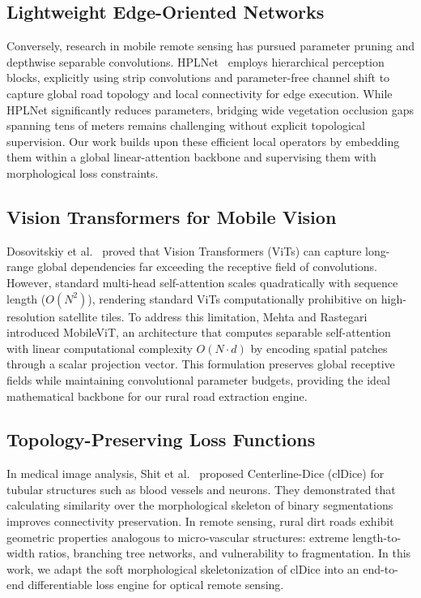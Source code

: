 \documentclass[conference]{IEEEtran}
\begin{document}
\subsection{Lightweight Edge-Oriented Networks}
Conversely, research in mobile remote sensing has pursued parameter pruning and depthwise separable convolutions. HPLNet~\cite{hplnet2025} employs hierarchical perception blocks, explicitly using strip convolutions and parameter-free channel shift to capture global road topology and local connectivity for edge execution. While HPLNet significantly reduces parameters, bridging wide vegetation occlusion gaps spanning tens of meters remains challenging without explicit topological supervision. Our work builds upon these efficient local operators by embedding them within a global linear-attention backbone and supervising them with morphological loss constraints.

\subsection{Vision Transformers for Mobile Vision}
Dosovitskiy et al.~\cite{dosovitskiy2020vit} proved that Vision Transformers (ViTs) can capture long-range global dependencies far exceeding the receptive field of convolutions. However, standard multi-head self-attention scales quadratically with sequence length ($O(N^2)$), rendering standard ViTs computationally prohibitive on high-resolution satellite tiles. To address this limitation, Mehta and Rastegari~\cite{mehta2022mobilevit} introduced MobileViT, an architecture that computes separable self-attention with linear computational complexity $O(N \cdot d)$ by encoding spatial patches through a scalar projection vector. This formulation preserves global receptive fields while maintaining convolutional parameter budgets, providing the ideal mathematical backbone for our rural road extraction engine.

\subsection{Topology-Preserving Loss Functions}
In medical image analysis, Shit et al.~\cite{shit2021cldice} proposed Centerline-Dice (clDice) for tubular structures such as blood vessels and neurons. They demonstrated that calculating similarity over the morphological skeleton of binary segmentations improves connectivity preservation. In remote sensing, rural dirt roads exhibit geometric properties analogous to micro-vascular structures: extreme length-to-width ratios, branching tree networks, and vulnerability to fragmentation. In this work, we adapt the soft morphological skeletonization of clDice into an end-to-end differentiable loss engine for optical remote sensing.
\end{document}
